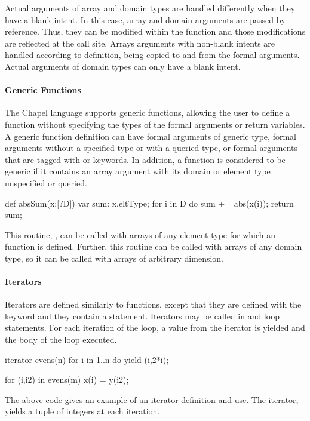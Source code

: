Actual arguments of array and domain types are handled differently when
they have a blank intent.  In this case, array and domain arguments are 
passed by reference.  Thus, they can be modified within the function and 
those modifications are reflected at the call site.  Arrays arguments 
with non-blank intents are handled according to definition, being copied 
to and from the formal arguments.  Actual arguments of domain types can
only have a blank intent.

\paragraph{Generic Functions}
The Chapel language supports generic functions, allowing the user
to define a function without specifying the types of the formal arguments
or return variables.  A generic function definition can have formal arguments  
of generic type, formal arguments without a specified type or 
with a queried type, or formal arguments that are tagged with 
 or  keywords.  In addition, a function is
considered to be generic if it contains an array argument with its
domain or element type unspecified or queried.

\begin{example}
\begin{chapel}
def absSum(x:[?D]) {
  var sum: x.eltType;
  for i in D do sum += abs(x(i));
  return sum;
}
\end{chapel}
This routine, , can be called
with arrays of any element type for which an  function is
defined.  Further, this routine can be called with arrays of 
any domain type, so it can be called with arrays of arbitrary dimension.
\end{example}

\paragraph{Iterators}
Iterators are defined similarly to functions, except that
they are defined with the keyword  and they
contain a  statement.
Iterators may be called in  and  loop
statements.  For each iteration of the loop, a value from the
iterator is yielded and the body of the loop executed.
\begin{example}
\begin{chapel}
iterator evens(n) {
  for i in 1..n do yield (i,2*i);
}

for (i,i2) in evens(m) {
  x(i) = y(i2);
}
\end{chapel}
The above code gives an example of an iterator definition and use.
The iterator,  yields a tuple of integers at each iteration.
\end{example}

